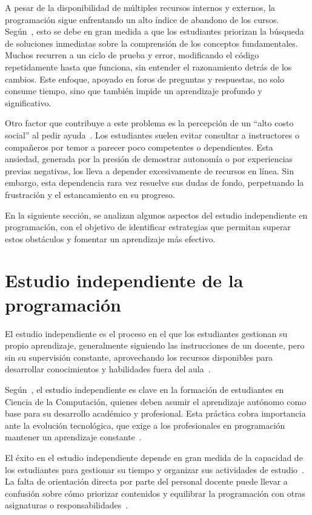 A pesar de la disponibilidad de múltiples recursos internos y externos, la programación sigue enfrentando un alto índice de abandono de los cursos. Según~\cite{wong2022}, esto se debe en gran medida a que los estudiantes priorizan la búsqueda de soluciones inmediatas sobre la comprensión de los conceptos fundamentales. Muchos recurren a un ciclo de prueba y error, modificando el código repetidamente hasta que funciona, sin entender el razonamiento detrás de los cambios. Este enfoque, apoyado en foros de preguntas y respuestas, no solo consume tiempo, sino que también impide un aprendizaje profundo y significativo.

Otro factor que contribuye a este problema es la percepción de un ``alto costo social'' al pedir ayuda~\cite{wong2022}. Los estudiantes suelen evitar consultar a instructores o compañeros por temor a parecer poco competentes o dependientes. Esta ansiedad, generada por la presión de demostrar autonomía o por experiencias previas negativas, los lleva a depender excesivamente de recursos en línea. Sin embargo, esta dependencia rara vez resuelve sus dudas de fondo, perpetuando la frustración y el estancamiento en su progreso.

En la siguiente sección, se analizan algunos aspectos del estudio independiente en programación, con el objetivo de identificar estrategias que permitan superar estos obstáculos y fomentar un aprendizaje más efectivo.

\section{Estudio independiente de la programación}\label{sec:study}

El estudio independiente es el proceso en el que los estudiantes gestionan su propio aprendizaje, generalmente siguiendo las instrucciones de un docente, pero sin su supervisión constante, aprovechando los recursos disponibles para desarrollar conocimientos y habilidades fuera del aula~\cite{proskuraLytvynova2020}.

Según~\cite{proskuraLytvynova2020}, el estudio independiente es clave en la formación de estudiantes en Ciencia de la Computación, quienes deben asumir el aprendizaje autónomo como base para su desarrollo académico y profesional. Esta práctica cobra importancia ante la evolución tecnológica, que exige a los profesionales en programación mantener un aprendizaje constante~\cite{proskuraLytvynova2020}.

El éxito en el estudio independiente depende en gran medida de la capacidad de los estudiantes para gestionar su tiempo y organizar sus actividades de estudio~\cite{overklift2019}. La falta de orientación directa por parte del personal docente puede llevar a confusión sobre cómo priorizar contenidos y equilibrar la programación con otras asignaturas o responsabilidades~\cite{proskuraLytvynova2020}. 

